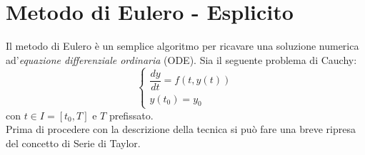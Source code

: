 \chapter[Metodo di Eulero]{Metodo di Eulero - Esplicito}

Il metodo di Eulero è un semplice algoritmo per ricavare una soluzione numerica ad'\textit{equazione differenziale ordinaria} (ODE).
Sia il seguente problema di Cauchy:
\begin{equation}
	\label{ode}
	\begin{cases}
		\dfrac{dy}{dt} = f(t,y(t)) \\[0.2cm]
		y(t_{0}) = y_{0}
	\end{cases}
\end{equation}
con $t \in I = [t_{0},T]$ e $T$ prefissato.
\\Prima di procedere con la descrizione della tecnica si può fare una breve ripresa del concetto di Serie di Taylor.

